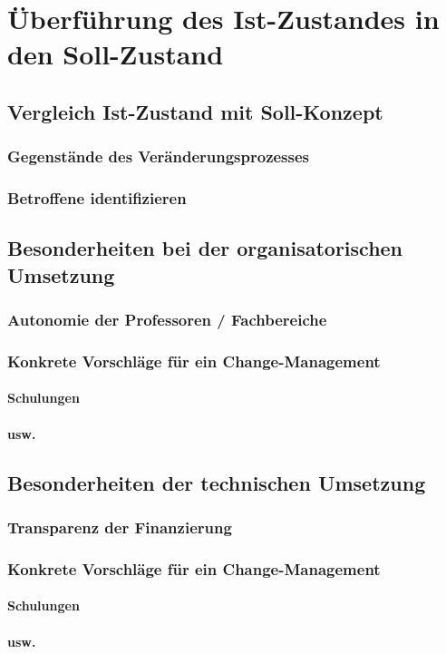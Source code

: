 \chapter{Überführung des Ist-Zustandes in den Soll-Zustand}






\section{Vergleich Ist-Zustand mit Soll-Konzept}
\subsection{Gegenstände des Veränderungsprozesses}
\subsection{Betroffene identifizieren}

\section{Besonderheiten bei der organisatorischen Umsetzung}
\subsection{Autonomie der Professoren / Fachbereiche}
\subsection{Konkrete Vorschläge für ein Change-Management}
\subsubsection{Schulungen}
\subsubsection{usw.}

\section{Besonderheiten der technischen Umsetzung}
\subsection{Transparenz der Finanzierung}
\subsection{Konkrete Vorschläge für ein Change-Management}
\subsubsection{Schulungen}
\subsubsection{usw.}